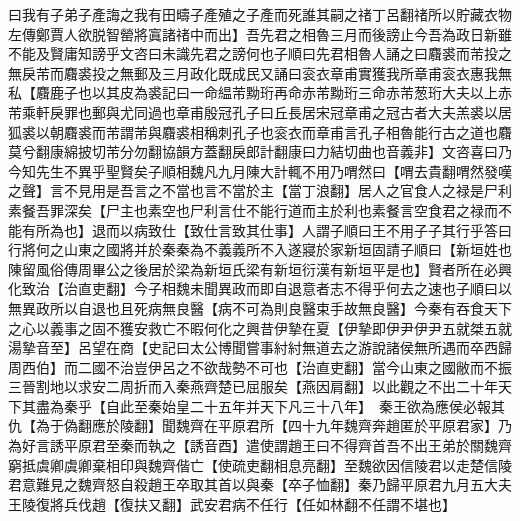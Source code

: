 曰我有子弟子產誨之我有田疇子產殖之子產而死誰其嗣之禇丁呂翻禇所以貯藏衣物左傳鄭賈人欲脱智罃將寘諸禇中而出】吾先君之相魯三月而後謗止今吾為政日新雖不能及賢庸知謗乎文咨曰未識先君之謗何也子順曰先君相魯人誦之曰麛裘而芾投之無戾芾而麛裘投之無郵及三月政化既成民又誦曰衮衣章甫實獲我所章甫衮衣惠我無私【麛鹿子也以其皮為裘記曰一命緼芾黝珩再命赤芾黝珩三命赤芾葱珩大夫以上赤芾乘軒戾罪也郵與尤同過也章甫殷冠孔子曰丘長居宋冠章甫之冠古者大夫羔裘以居狐裘以朝麛裘而芾謂芾與麛裘相稱刺孔子也衮衣而章甫言孔子相魯能行古之道也麛莫兮翻康綿披切芾分勿翻協韻方蓋翻戾郎計翻康曰力結切曲也音義非】文咨喜曰乃今知先生不異乎聖賢矣子順相魏凡九月陳大計輒不用乃喟然曰【喟去貴翻喟然發嘆之聲】言不見用是吾言之不當也言不當於主【當丁浪翻】居人之官食人之禄是尸利素餐吾罪深矣【尸主也素空也尸利言仕不能行道而主於利也素餐言空食君之禄而不能有所為也】退而以病致仕【致仕言致其仕事】人謂子順曰王不用子子其行乎答曰行將何之山東之國將并於秦秦為不義義所不入遂寢於家新垣固請子順曰【新垣姓也陳留風俗傳周畢公之後居於梁為新垣氏梁有新垣衍漢有新垣平是也】賢者所在必興化致治【治直吏翻】今子相魏未聞異政而即自退意者志不得乎何去之速也子順曰以無異政所以自退也且死病無良醫【病不可為則良醫束手故無良醫】今秦有吞食天下之心以義事之固不獲安救亡不暇何化之興昔伊摯在夏【伊摯即伊尹伊尹五就桀五就湯摯音至】呂望在商【史記曰太公博聞嘗事紂紂無道去之游說諸侯無所遇而卒西歸周西伯】而二國不治豈伊呂之不欲哉勢不可也【治直吏翻】當今山東之國敝而不振三晉割地以求安二周折而入秦燕齊楚已屈服矣【燕因肩翻】以此觀之不出二十年天下其盡為秦乎【自此至秦始皇二十五年并天下凡三十八年】　秦王欲為應侯必報其仇【為于偽翻應於陵翻】聞魏齊在平原君所【四十九年魏齊奔趙匿於平原君家】乃為好言誘平原君至秦而執之【誘音酉】遣使謂趙王曰不得齊首吾不出王弟於關魏齊窮抵虞卿虞卿棄相印與魏齊偕亡【使疏吏翻相息亮翻】至魏欲因信陵君以走楚信陵君意難見之魏齊怒自殺趙王卒取其首以與秦【卒子恤翻】秦乃歸平原君九月五大夫王陵復將兵伐趙【復扶又翻】武安君病不任行【任如林翻不任謂不堪也】

